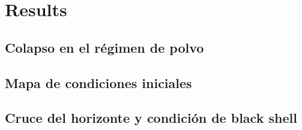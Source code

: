 \chapter{Results}
\label{cap:resultados}

\section{Colapso en el régimen de polvo}

\section{Mapa de condiciones iniciales}

\section{Cruce del horizonte y condición de black shell}
